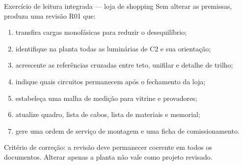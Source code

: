 \begin{frame}{Exercício de leitura integrada — loja de shopping}
\small
Sem alterar as premissas, produza uma revisão R01 que:
\begin{enumerate}
\item transfira cargas monofásicas para reduzir o desequilíbrio;
\item identifique na planta todas as luminárias de C2 e sua orientação;
\item acrescente as referências cruzadas entre teto, unifilar e detalhe de trilho;
\item indique quais circuitos permanecem após o fechamento da loja;
\item estabeleça uma malha de medição para vitrine e provadores;
\item atualize quadro, lista de cabos, lista de materiais e memorial;
\item gere uma ordem de serviço de montagem e uma ficha de comissionamento.
\end{enumerate}
\begin{caixaAt}
Critério de correção: a revisão deve permanecer coerente em todos os documentos. Alterar apenas a planta não vale como projeto revisado.
\end{caixaAt}
\end{frame}
